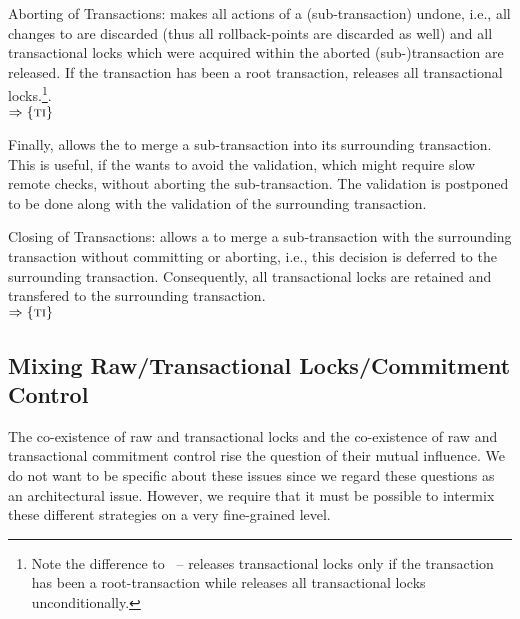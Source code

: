 \documentclass[a4paper, 12pt]{book}
\newcommand{\INTERFACE}[1]{$\Rightarrow\left\{#1\right\}$}
\begin{document}
\begin{requirement*}{Aborting of Transactions: \dbaiTRABORT}
  \dbaiTRABORT makes all actions of a (sub-transaction) undone, i.e.,
  all changes to  are discarded (thus all rollback-points
  are discarded as well) and all transactional locks which were
  acquired within the aborted (sub-)transaction are released. If the
  transaction has been a root transaction, \dbaiTRABORT releases all
  transactional locks.\footnote{Note the difference to \dbaiTRCOMMIT\ 
  -- \dbaiTRCOMMIT releases transactional locks only if the
  transaction has been a root-transaction while \dbaiTRABORT releases
  all transactional locks unconditionally.}.\\
  \INTERFACE{\TRANSACTION}
\end{requirement*}
%
Finally, \dbaiTRCLOSE allows the  to merge a sub-transaction into
its surrounding transaction. This is useful, if the \dt{client} wants to avoid
the validation, which might require slow remote checks, without aborting the
sub-transaction. The validation is postponed to be done along with the validation
of the surrounding transaction.
%
\begin{requirement*}{Closing of Transactions: \dbaiTRCLOSE}
  \dbaiTRCLOSE allows a  to merge a sub-transaction with the
  surrounding transaction without committing or aborting, i.e., this decision
  is deferred to the surrounding transaction. Consequently, all
  transactional locks are retained and transfered to the surrounding
  transaction.\\
  \INTERFACE{\TRANSACTION}
\end{requirement*}


\subsection{Mixing Raw/Transactional Locks/Commitment Control}

The co-existence of raw and transactional locks and the co-existence of
raw and transactional commitment control rise the question of their
mutual influence. We do not want to be specific about these issues
since we regard these questions as an architectural issue. However, we
require that it must be possible to intermix these different
strategies on a very fine-grained level.
\end{document}

